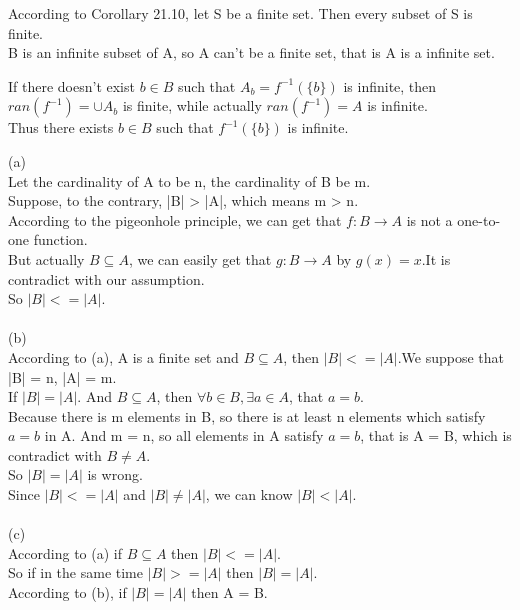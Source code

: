 \documentclass[a4paper, justified]{tufte-handout}
\begin{document}
\begin{solution}
  According to Corollary 21.10, let S be a finite set. Then every subset of S is finite.\\
  B is an infinite subset of A, so A can't be a finite set, that is A is a infinite set.
\end{solution}

\begin{problem}[UD Problem 22.11]
\end{problem}

\begin{solution}
  If there doesn't exist $b \in B$ such that $A_b = f^{-1}(\{b\})$ is infinite, then $ran(f^{-1}) = \cup A_b$ is finite, while actually $ran(f^{-1}) = A$ is infinite. \\
  Thus there exists $b \in B$ such that $f^{-1}(\{b\})$ is infinite.
\end{solution}

\begin{problem}[UD Problem 22.18]
\end{problem}

\begin{solution}
  (a)\\
  Let the cardinality of A to be n, the cardinality of B be m.\\
  Suppose, to the contrary, |B| > |A|, which means m > n.\\
  According to the pigeonhole principle, we can get that $f:B \rightarrow A$ is not a one-to-one function.\\
  But actually $B \subseteq A$, we can easily get that $g:B \rightarrow A$ by $g(x) = x$.It is contradict with our assumption.\\
  So $|B| <= |A|$.\\
  \\
  (b)\\
  According  to (a), A is a finite set and $B \subseteq A$, then $|B| <= |A|$.We suppose that |B| = n, |A| = m. \\
  If $|B| = |A|$. And $B \subseteq A$, then $\forall b\in B, \exists a\in A$, that $a = b$. \\
  Because there is m elements in B, so there is at least n elements which satisfy $a = b$ in A. And m = n, so all elements in A satisfy $a = b$, that is A = B, which is contradict with $B \neq A$. \\
  So $|B| = |A|$ is wrong.\\
  Since
  $|B| <= |A|$ and $|B| \neq |A|$, we can know $|B| < |A|$.\\
  \\
  (c)\\
  According to (a) if $B \subseteq A$ then $|B| <= |A|$. \\
  So if in the same time $|B| >= |A|$ then $|B| = |A|$.\\
  According to (b), if $|B| = |A|$ then A = B.\\
\end{solution}
\end{document}
